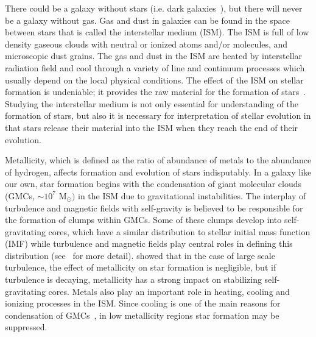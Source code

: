 There could be a galaxy without stars (i.e. dark galaxies~\citep[][and references therein]{Cantalupo12}), but there will never be a galaxy without gas. %
Gas and dust in galaxies can be found in the space between stars that is called the interstellar medium (ISM). The ISM is full of low density gaseous clouds with neutral or ionized atoms and/or molecules, and microscopic dust grains.
The gas and dust in the ISM are heated by interstellar radiation field and cool through a variety of line and continuum processes which usually depend on the local physical conditions. 
The effect of the ISM on stellar formation is undeniable;  it provides the raw material for the formation of stars~\citep[e.g.][]{Kennicutt08,Bigiel08}.
Studying the interstellar medium is not only essential for understanding of the formation of stars, but also it is necessary for interpretation of stellar evolution in that stars release their material into the ISM when they reach the end of their evolution.

Metallicity, which is defined as the ratio of abundance of metals to the abundance of hydrogen, affects formation and evolution of stars indisputably. %
In a galaxy like our own, star formation begins with the condensation of giant molecular clouds (GMCs, $\sim 10^7$ M$_{\odot})$ in the ISM due to gravitational instabilities. 
The interplay of turbulence and magnetic fields with self-gravity is believed to be responsible for the formation of clumps within GMCs. 
Some of these clumps develop into self-gravitating cores, which have a similar distribution to stellar initial mass function (IMF) while turbulence and magnetic fields play central roles in defining this distribution (see~\cite{McKee07} for more detail). %
\cite{Walch11} showed that in the case of large scale turbulence, the effect of metallicity on star formation is negligible, but if turbulence is decaying,  metallicity has a strong impact on stabilizing self-gravitating cores. %
Metals also play an important role in heating, cooling and ionizing processes in the ISM. %
Since cooling is one of the main reasons for condensation of GMCs~\citep[e.g.][]{Maio07}, in low metallicity regions star formation may be suppressed. %

